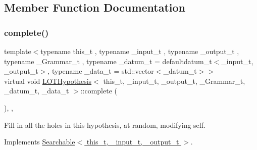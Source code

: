 \subsection{Member Function Documentation}
\mbox{\label{class_l_o_t_hypothesis_a1c4f97c379f7acf16d4773790b9e7a41}} 
\subsubsection{\texorpdfstring{complete()}{complete()}}
{\footnotesize\ttfamily template$<$typename this\+\_\+t , typename \+\_\+input\+\_\+t , typename \+\_\+output\+\_\+t , typename \+\_\+\+Grammar\+\_\+t , typename \+\_\+datum\+\_\+t  = defaultdatum\+\_\+t$<$\+\_\+input\+\_\+t, \+\_\+output\+\_\+t$>$, typename \+\_\+data\+\_\+t  = std\+::vector$<$\+\_\+datum\+\_\+t$>$$>$ \\
virtual void \hyperlink{class_l_o_t_hypothesis}{L\+O\+T\+Hypothesis}$<$ this\+\_\+t, \+\_\+input\+\_\+t, \+\_\+output\+\_\+t, \+\_\+\+Grammar\+\_\+t, \+\_\+datum\+\_\+t, \+\_\+data\+\_\+t $>$\+::complete (\begin{DoxyParamCaption}{ }\end{DoxyParamCaption})\hspace{0.3cm}{\ttfamily [inline]}, {\ttfamily [override]}, {\ttfamily [virtual]}}



Fill in all the holes in this hypothesis, at random, modifying self. 



Implements \hyperlink{class_searchable_a29ab2eb0471e2e9d96d39f0349f21571}{Searchable$<$ this\+\_\+t, \+\_\+input\+\_\+t, \+\_\+output\+\_\+t $>$}.

\mbox{\label{class_l_o_t_hypothesis_a32135631f7311a9a4a5a43c3f2ddfd6b}} 
